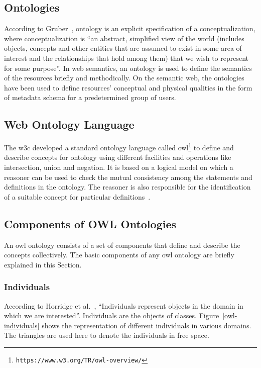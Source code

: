 \begin{doublespace}
\section{Ontologies}
\label{sec:ontologies}

According to Gruber~\cite{gruber1995towards}, 
ontology is 
an explicit specification of a conceptualization, 
where conceptualization is 
``an abstract, simplified view of the world 
(includes objects, concepts and other entities 
that are assumed to exist in some area of interest and the relationships 
that hold among them) 
that we wish to represent for some purpose''. 
In web semantics, 
an ontology is used to define the semantics of the resources briefly and methodically. 
On the semantic web, 
the ontologies have been used 
to define resources' conceptual and physical qualities 
in the form of metadata schema for a predetermined group of users.

\subsection{Web Ontology Language}
\label{subsec:owlontologies}

The \ac{w3c} developed a standard ontology language called 
\ac{owl}\footnote{\tt https://www.w3.org/TR/owl-overview/} 
to define and describe concepts for ontology
using different facilities and operations like intersection, union and negation. 
It is based on a logical model 
on which a reasoner 
can be used to check the mutual consistency 
among the statements and definitions in the ontology. 
The reasoner is also responsible for the identification of a 
suitable concept for particular definitions~\cite{horridge2011practical}.

\subsection{Components of OWL Ontologies}
\label{subsec:componentsofowlontologies}

An \ac{owl} ontology consists of a set of components that define and describe the concepts collectively. 
The basic components of any \ac{owl} ontology 
are briefly explained in this Section.

\subsubsection{Individuals}
\label{subsubsec:individuals}

According to Horridge et al.~\cite{horridge2011practical}, 
``Individuals represent objects in the domain in which we are interested''. 
Individuals are the objects of classes. 
Figure~\ref{owl-individuals} 
shows the representation of different individuals in various domains. 
The triangles are used here to denote the individuals in free space.


\end{doublespace}
